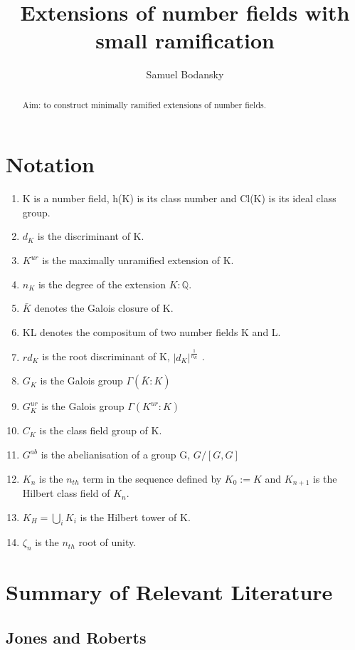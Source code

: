 \documentclass[preprint,12pt,reqno]{elsarticle}
\begin{document}
\begin{frontmatter}
\title{Extensions of number fields with small ramification}
\author{Samuel Bodansky}
\address{Oxford,UK}
\begin{abstract}
Aim: to construct minimally ramified extensions of number fields.
\end{abstract}
\end{frontmatter}
\section{Notation}
\begin{enumerate}
    \item K is a number field, h(K) is its class number and Cl(K) is its ideal class group.
    \item $d_K$ is the discriminant of K.
    \item $K^{ur}$ is the maximally unramified extension of K.
    \item $n_K$ is the degree of the extension $K:\mathbb{Q}$.
    \item $\bar{K}$ denotes the Galois closure of K.
    \item KL denotes the compositum of two number fields K and L.
    \item $rd_K$ is the root discriminant of K, $|d_K|^\frac{1}{n_K}$ .
    \item $G_K$ is the Galois group $\Gamma(\bar{K}:K)$
    \item $G_K^{ur}$ is the Galois group $\Gamma(K^{ur}:K)$
    \item $C_K$ is the class field group of K. 
    \item $G^{ab}$ is the abelianisation of a group G, $G/[G,G]$
    \item $K_n$ is the $n_{th}$ term in the sequence defined by $K_0:=K$ and $K_{n+1}$ is the Hilbert class field of $K_n$.
    \item $K_H=\bigcup_{i}K_{i}$ is the Hilbert tower of K.  
    \item $\zeta_n$ is the $n_{th}$ root of unity. 
\end{enumerate}
\section{Summary of Relevant Literature}
\subsection{Jones and Roberts}
\end{document}
